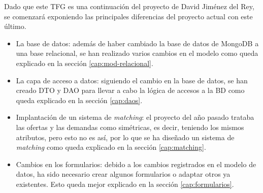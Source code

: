 \documentclass[11pt]{book}
\begin{document}
	Dado que este TFG es una continuación del proyecto de David Jiménez del Rey, se comenzará exponiendo las principales diferencias del proyecto actual con este último.
	\begin{itemize}
		\item La base de datos: además de haber cambiado la base de datos de MongoDB a una base relacional, se han realizado varios cambios en el modelo 		como queda explicado en la sección \ref{cap:mod-relacional}.
		\item La capa de acceso a datos: siguiendo el cambio en la base de datos, se han creado DTO y DAO para llevar a cabo la lógica de accesos a la BD 			como queda explicado en la sección \ref{cap:daos}.
		\item Implantación de un sistema de \emph{matching}: el proyecto del año pasado trataba las ofertas y las demandas como simétricas, es decir, teniendo los mismos atributos, pero esto no 	es así, por lo que se ha diseñado un sistema de\emph{ matching} como queda explicado en la sección \ref{cap:matching}.
		\item Cambios en los formularios: debido a los cambios registrados en el modelo de datos, ha sido necesario crear algunos formularios o adaptar otros ya existentes. Esto queda mejor explicado en la sección \ref{cap:formularios}.
	\end{itemize}
	
\end{document}
